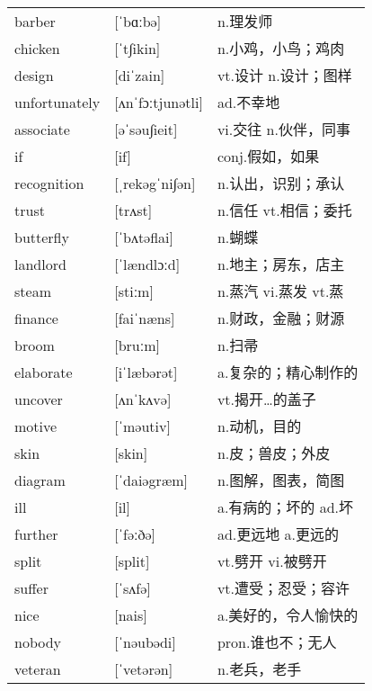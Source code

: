 \documentclass[a4paper]{article}
\begin{document}
\section{}
\begin{tabular}{l l l}

barber & [ˈbɑːbə] & n.理发师 \\
chicken & [ˈt∫ikin] & n.小鸡，小鸟；鸡肉 \\
design & [diˈzain] & vt.设计 n.设计；图样 \\
unfortunately & [ʌnˈfɔːtjunətli] & ad.不幸地 \\
associate & [əˈsəu∫ieit] & vi.交往 n.伙伴，同事 \\
if & [if] & conj.假如，如果 \\
recognition & [ˌrekəgˈni∫ən] & n.认出，识别；承认 \\
trust & [trʌst] & n.信任 vt.相信；委托 \\
butterfly & [ˈbʌtəflai] & n.蝴蝶 \\
landlord & [ˈlændlɔːd] & n.地主；房东，店主 \\
steam & [stiːm] & n.蒸汽 vi.蒸发 vt.蒸 \\
finance & [faiˈnæns] & n.财政，金融；财源 \\
broom & [bruːm] & n.扫帚 \\
elaborate & [iˈlæbərət] & a.复杂的；精心制作的 \\
uncover & [ʌnˈkʌvə] & vt.揭开…的盖子 \\
motive & [ˈməutiv] & n.动机，目的 \\
skin & [skin] & n.皮；兽皮；外皮 \\
diagram & [ˈdaiəgræm] & n.图解，图表，简图 \\
ill & [il] & a.有病的；坏的 ad.坏 \\
further & [ˈfəːðə] & ad.更远地 a.更远的 \\
split & [split] & vt.劈开 vi.被劈开 \\
suffer & [ˈsʌfə] & vt.遭受；忍受；容许 \\
nice & [nais] & a.美好的，令人愉快的 \\
nobody & [ˈnəubədi] & pron.谁也不；无人 \\
veteran & [ˈvetərən] & n.老兵，老手 \\

\end{tabular}
\end{document}
